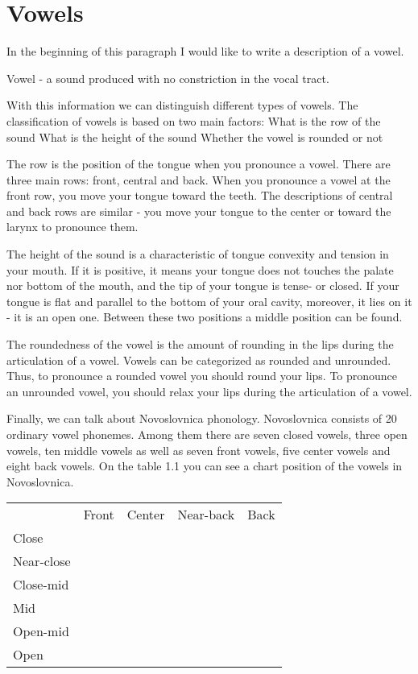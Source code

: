 \section{Vowels}

In the beginning of this paragraph I would like to write a description of a vowel.

Vowel - a sound produced with no constriction in the vocal tract.

With this information we can distinguish different types of vowels. The classification of vowels is based on two main factors:
What is the row of the sound
What is the height of the sound
Whether the vowel is rounded or not

The row is the position of the tongue when you pronounce a vowel. There are three main rows: front, central and back. When you pronounce a vowel at the front row, you move your tongue toward the teeth. The descriptions of central and back rows are similar - you move your tongue to the center or toward the larynx to pronounce them.

The height of the sound is a characteristic of tongue convexity and tension in your mouth. If it is positive, it means your tongue does not touches the palate nor bottom of the mouth, and the tip of your tongue is tense- or closed. If your tongue is flat and parallel to the bottom of your oral cavity, moreover, it lies on it - it is an open one. Between these two positions a middle position can be found.

The roundedness of the vowel is the amount of rounding in the lips during the articulation of a vowel. Vowels can be categorized as rounded and unrounded. Thus, to pronounce a rounded vowel you should round your lips. To pronounce an unrounded vowel, you should relax your lips during the articulation of a vowel.

Finally, we can talk about Novoslovnica phonology. Novoslovnica consists of 20 ordinary vowel phonemes. Among them there are seven closed vowels, three open vowels, ten middle vowels as well as seven front vowels, five center vowels and eight back vowels. On the table 1.1 you can see a chart position of the vowels in Novoslovnica.

\begin{table}[]
	\begin{tabular}{lllll}
		& Front & Center & Near-back & Back \\
		Close      &       &        &           &      \\
		Near-close &       &        &           &      \\
		Close-mid  &       &        &           &      \\
		Mid        &       &        &           &      \\
		Open-mid   &       &        &           &      \\
		Open       &       &        &           &     
	\end{tabular}
\end{table}

